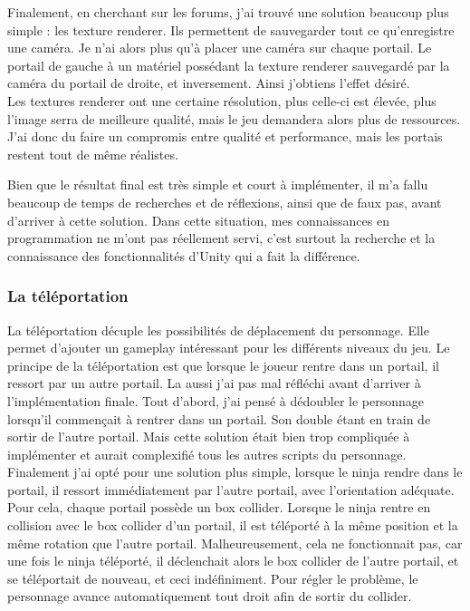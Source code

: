 \documentclass[12pt]{article}
\begin{document}
Finalement, en cherchant sur les forums, j'ai trouvé une solution beaucoup plus simple : les \gls{texture renderer}. Ils permettent de sauvegarder tout ce qu'enregistre une caméra. Je n'ai alors plus qu'à placer une caméra sur chaque portail. Le portail de gauche à un matériel possédant la texture renderer sauvegardé par la caméra du portail de droite, et inversement. Ainsi j'obtiens l'effet désiré.\\
Les textures renderer ont une certaine résolution, plus celle-ci est élevée, plus l'image serra de meilleure qualité, mais le jeu demandera alors plus de ressources. J'ai donc du faire un compromis entre qualité et performance, mais les portais restent tout de même réalistes.

Bien que le résultat final est très simple et court à implémenter, il m'a fallu beaucoup de temps de recherches et de réflexions, ainsi que de faux pas, avant d'arriver à cette solution. Dans cette situation, mes connaissances en programmation ne m'ont pas réellement servi, c'est surtout la recherche et la connaissance des fonctionnalités d'Unity qui a fait la différence.

\newpage

\subsubsection{La téléportation}

La téléportation décuple les possibilités de déplacement du personnage. Elle permet d'ajouter un gameplay intéressant pour les différents niveaux du jeu. Le principe de la téléportation est que lorsque le joueur rentre dans un portail, il ressort par un autre portail. La aussi j'ai pas mal réfléchi avant d'arriver à l'implémentation finale. Tout d'abord, j'ai pensé à dédoubler le personnage lorsqu'il commençait à rentrer dans un portail. Son double étant en train de sortir de l'autre portail. Mais cette solution était bien trop compliquée à implémenter et aurait complexifié tous les autres scripts du personnage.\\
Finalement j'ai opté pour une solution plus simple, lorsque le ninja rendre dans le portail, il ressort immédiatement par l'autre portail, avec l'orientation adéquate.\\
Pour cela, chaque portail possède un \gls{box collider}. Lorsque le ninja rentre en collision avec le box collider d'un portail, il est téléporté à la même position et la même rotation que l'autre portail. Malheureusement, cela ne fonctionnait pas, car une fois le ninja téléporté, il déclenchait alors le box collider de l'autre portail, et se téléportait de nouveau, et ceci indéfiniment. Pour régler le problème, le personnage avance automatiquement tout droit afin de sortir du collider.\\
\end{document}
